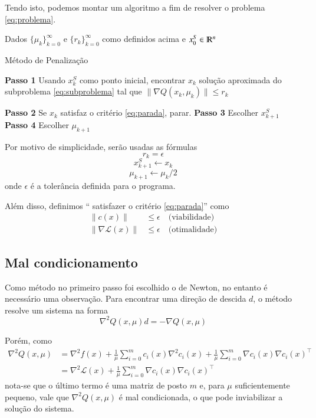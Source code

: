 Tendo isto, podemos montar um algoritmo a fim de resolver o problema \ref{eq:problema}.

Dados $\{\mu_k\}_{k = 0}^\infty$ e $\{r_k\}_{k = 0}^\infty$ como definidos acima
e $x_0^S \in \varmathbb{R}^n$
\begin{algorithm}[h]
    \caption{Método de Penalização}
    \label{alg:penalizacao}
    \begin{algorithmic}
            \State \textbf{Passo 1} Usando $x_k^S$ como ponto inicial, encontrar $x_k$ solução
                   aproximada do subproblema \ref{eq:subproblema}
                   tal que $\| \nabla Q(x_k, \mu_k) \| \leq r_k$

            \State \textbf{Passo 2} Se $x_k$ satisfaz o critério \ref{eq:parada}, parar.
            \State \textbf{Passo 3} Escolher $x_{k+1}^S$
            \State \textbf{Passo 4} Escolher $\mu_{k+1}$
        \EndFor
    \end{algorithmic}
\end{algorithm}

Por motivo de simplicidade, serão usadas as fórmulas
$$ r_k = \epsilon$$
$$ x_{k+1}^S \gets x_k$$
$$ \mu_{k+1} \gets \mu_k/2$$
onde $\epsilon$ é a tolerância definida para o programa.

Além disso, definimos `` satisfazer o critério \ref{eq:parada}'' como
\begin{equation*}
    \begin{aligned}
        \| c(x) \| & \leq \epsilon \quad \text{(viabilidade)} \\
        \| \nabla \mathcal{L}(x) \| & \leq \epsilon \quad \text{(otimalidade)}
    \end{aligned}
\end{equation*}

\subsection{Mal condicionamento}
    Como método no primeiro passo foi escolhido o de Newton, no entanto é necessário
    uma observação. Para encontrar uma direção de descida $d$, o método resolve um sistema
    na forma
    $$ \nabla^2 Q(x, \mu) d = -\nabla Q(x, \mu) $$

    Porém, como
    \begin{equation}
        \begin{aligned}
            \nabla^2 Q(x, \mu) &= \nabla^2 f(x) + \frac{1}{\mu}\sum_{i = 0}^m c_i(x)\nabla^2 c_i(x) + \frac{1}{\mu}\sum_{i = 0}^m \nabla c_i(x)\nabla c_i(x)^\top \\
                               &= \nabla^2 \mathcal{L}(x) + \frac{1}{\mu}\sum_{i = 0}^m \nabla c_i(x)\nabla c_i(x)^\top
        \end{aligned}
    \end{equation}
    nota-se que o último termo é uma matriz de posto $m$ e, para $\mu$ suficientemente
    pequeno, vale que $\nabla^2 Q(x, \mu)$ é mal condicionada, o que pode inviabilizar
    a solução do sistema.

